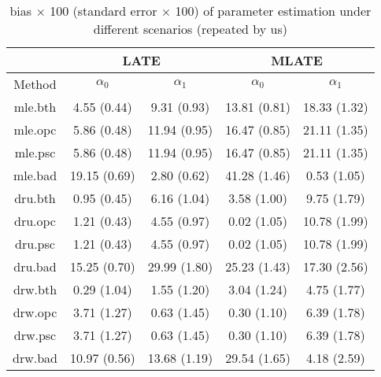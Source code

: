 \documentclass{article}
\begin{document}
\begin{table}
\footnotesize
\centering
\begin{tabular}[h]{c|cc|cc}
\toprule
    & \multicolumn{2}{c|}{LATE} &\multicolumn{2}{c}{MLATE}\\
\midrule
    Method & $\alpha_0$ & $\alpha_1$ & $\alpha_0$ & $\alpha_1$\\
\midrule
    mle.bth&4.55 (0.44) & 9.31 (0.93)&13.81 (0.81) & 18.33 (1.32)\\
    mle.opc&5.86 (0.48) & 11.94 (0.95)&16.47 (0.85) & 21.11 (1.35)\\
    mle.psc&5.86 (0.48) & 11.94 (0.95)&16.47 (0.85) & 21.11 (1.35)\\
    mle.bad&19.15 (0.69) & 2.80 (0.62)&41.28 (1.46) & 0.53 (1.05)\\
    dru.bth&0.95 (0.45) & 6.16 (1.04)&3.58 (1.00) & 9.75 (1.79)\\
    dru.opc&1.21 (0.43) & 4.55 (0.97)&0.02 (1.05) & 10.78 (1.99)\\
    dru.psc&1.21 (0.43) & 4.55 (0.97)&0.02 (1.05) & 10.78 (1.99)\\
    dru.bad&15.25 (0.70) & 29.99 (1.80)&25.23 (1.43) & 17.30 (2.56)\\
    drw.bth&0.29 (1.04) & 1.55 (1.20)&3.04 (1.24) & 4.75 (1.77)\\
    drw.opc&3.71 (1.27) & 0.63 (1.45)&0.30 (1.10) & 6.39 (1.78)\\
    drw.psc&3.71 (1.27) & 0.63 (1.45)&0.30 (1.10) & 6.39 (1.78)\\
    drw.bad&10.97 (0.56) & 13.68 (1.19)&29.54 (1.65) & 4.18 (2.59)\\
\bottomrule
\end{tabular}
\caption{bias $\times$ 100 (standard error $\times$ 100) of parameter estimation under different scenarios (repeated by us)}
\label{ourbias}
\end{table}
\end{document}
